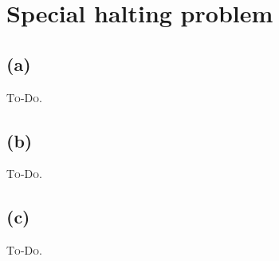 

\setcounter{section}{2}


\section{Special halting problem}

\subsection{(a)}
\textsc{To-Do.}

\subsection{(b)}
\textsc{To-Do.}

\subsection{(c)}
\textsc{To-Do.}



